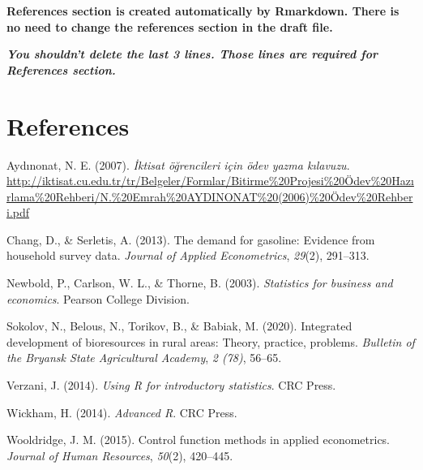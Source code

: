 \documentclass[
  12pt,
]{article}
\newlength{\cslhangindent}
\newlength{\cslentryspacingunit} %
\newenvironment{CSLReferences}[2] %
 {%
  \setlength{\parindent}{0pt}
  \ifodd #1
  \let\oldpar\par
  \def\par{\hangindent=\cslhangindent\oldpar}
  \fi
  \setlength{\parskip}{#2\cslentryspacingunit}
 }%
 {}
\begin{document}
\textbf{References section is created automatically by Rmarkdown. There is no need to change the references section in the draft file.}

\textbf{\emph{You shouldn't delete the last 3 lines. Those lines are required for References section.}}

\newpage

\hypertarget{references}{%
\section{References}\label{references}}

\hypertarget{refs}{}
\begin{CSLReferences}{1}{0}
\leavevmode{}%
Aydınonat, N. E. (2007). \emph{İktisat öğrencileri için ödev yazma kılavuzu}. \url{http://iktisat.cu.edu.tr/tr/Belgeler/Formlar/Bitirme\%20Projesi\%20Ödev\%20Hazırlama\%20Rehberi/N.\%20Emrah\%20AYDINONAT\%20(2006)\%20Ödev\%20Rehberi.pdf}

\leavevmode{}%
Chang, D., \& Serletis, A. (2013). The demand for gasoline: Evidence from household survey data. \emph{Journal of Applied Econometrics}, \emph{29}(2), 291--313.

\leavevmode{}%
Newbold, P., Carlson, W. L., \& Thorne, B. (2003). \emph{Statistics for business and economics}. Pearson College Division.

\leavevmode{}%
Sokolov, N., Belous, N., Torikov, B., \& Babiak, M. (2020). Integrated development of bioresources in rural areas: Theory, practice, problems. \emph{Bulletin of the Bryansk State Agricultural Academy}, \emph{2 (78)}, 56--65.

\leavevmode{}%
Verzani, J. (2014). \emph{Using {R} for introductory statistics}. CRC Press.

\leavevmode{}%
Wickham, H. (2014). \emph{Advanced {R}}. CRC Press.

\leavevmode{}%
Wooldridge, J. M. (2015). Control function methods in applied econometrics. \emph{Journal of Human Resources}, \emph{50}(2), 420--445.

\end{CSLReferences}
\end{document}
